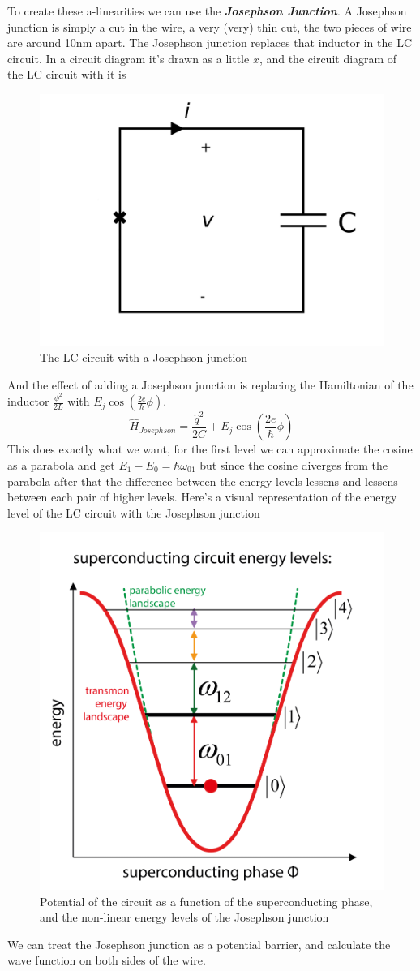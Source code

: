 To create these a-linearities we can use the \textbf{\textit{Josephson Junction}}. A Josephson junction is simply a cut in the wire, a very (very) thin cut, the two pieces of wire are around 10nm apart. The Josephson junction replaces that inductor in the LC circuit. In a circuit diagram it's drawn as a little $x$, and the circuit diagram of the LC circuit with it is
\begin{figure}[H]
    \centering
    \includegraphics[width=0.43\columnwidth]{LC-circuit-josephson.png}
    \caption{The LC circuit with a Josephson junction} 
    \label{fig:LC-circuit-Josephson}
\end{figure}
And the effect of adding a Josephson junction is replacing the Hamiltonian of the inductor $\frac{\phi^2}{2L}$ with $E_j \cos (\frac{2e}{\hbar} \phi)$.
\[
    \hat{H}_{Josephson} = \frac{\hat{q}^2}{2C} + E_j \cos (\frac{2e}{\hbar} \phi)
\]
This does exactly what we want, for the first level we can approximate the cosine as a parabola and get $E_1 - E_0 = \hbar \omega_{01}$ but since the cosine diverges from the parabola after that the difference between the energy levels lessens and lessens between each pair of higher levels. Here's a visual representation of the energy level of the LC circuit with the Josephson junction
\begin{figure}[H]
    \centering
    \includegraphics[width=0.4\columnwidth]{josephson-energy-levels.png}
    \caption{Potential of the circuit as a function of the superconducting phase, and the non-linear energy levels of the Josephson junction} 
    \label{fig:Josephson-energy-levels}
\end{figure}
We can treat the Josephson junction as a potential barrier, and calculate the wave function on both sides of the wire.

